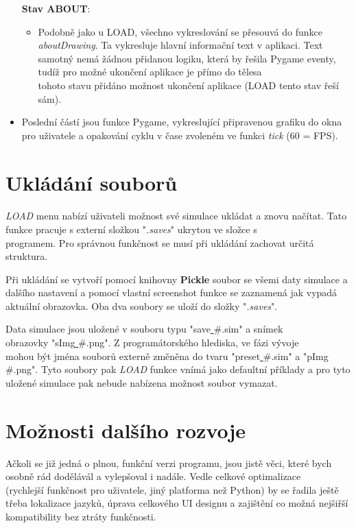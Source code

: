 \documentclass[a4paper, 12pt]{article}
\begin{document}
\begin{itemize}
        \textbf{Stav ABOUT}:
        \begin{itemize}
            \item Podobně jako u LOAD, všechno vykreslování se přesouvá do
                funkce \emph{aboutDrawing}. Ta vykresluje hlavní informační
                text v aplikaci. Text samotný nemá žádnou přidanou logiku,
                která by řešila Pygame eventy, tudíž pro možné ukončení
                aplikace je přímo do tělesa \\tohoto stavu přidáno možnost
                ukončení aplikace (LOAD tento stav řeší sám).
        \end{itemize}

    \item Poslední částí jsou funkce Pygame, vykreslující připravenou grafiku
        do okna pro uživatele a opakování cyklu v čase zvoleném ve funkci
        \emph{tick} (60 = FPS).
\end{itemize}

\newpage
\section{Ukládání souborů}
\paragraph{}
\emph{LOAD} menu nabízí uživateli možnost své simulace ukládat a znovu načítat.
Tato funkce pracuje s externí složkou "\emph{.saves}" ukrytou ve složce s
\\programem. Pro správnou funkčnost se musí při ukládání zachovat určitá
struktura. 

Při ukládání se vytvoří pomocí knihovny \textbf{Pickle} soubor se všemi daty
simulace a dalšího nastavení a pomocí vlastní screenshot funkce se zaznamená
jak vypadá aktuální obrazovka. Oba dva soubory se uloží do složky "\emph{.saves}".

Data simulace jsou uložené v souboru typu "save\underline{ }\#.sim" a snímek \\obrazovky
"sImg\underline{ }\#.png". Z programátorského hlediska, ve fázi vývoje \\mohou být jména
souborů externě změněna do tvaru "preset\underline{ }\#.sim" a "pImg\underline{ }\#.png". Tyto soubory
pak \emph{LOAD} funkce vnímá jako defaultní příklady a pro tyto uložené
simulace pak nebude nabízena možnost soubor vymazat.
\\
\section{Možnosti dalšího rozvoje}
Ačkoli se již jedná o plnou, funkční verzi programu, jsou jistě věci, které
bych osobně rád dodělávál a vylepšoval i nadále. Vedle celkové optimalizace
\\(rychlejší funkčnost pro uživatele, jiný platforma než Python) by se řadila
ještě třeba lokalizace jazyků, úprava celkového UI designu a zajištění co možná
nejšiřší kompatibility bez ztráty funkčnosti. 
\\\\
\end{document}
